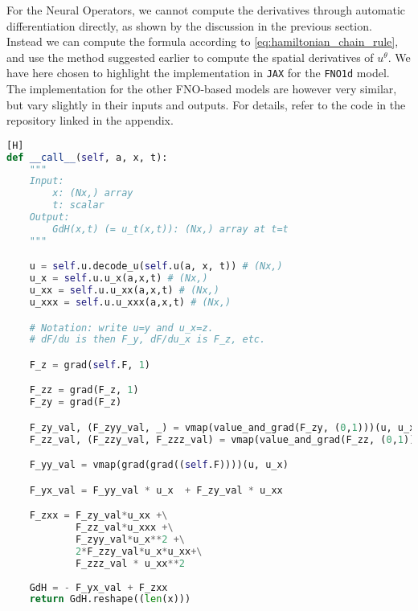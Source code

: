 For the Neural Operators, we cannot compute the derivatives through automatic differentiation directly, as shown by the discussion in the previous section.
Instead we can compute the formula according to \cref{eq:hamiltonian_chain_rule}, and use the method suggested earlier to compute the spatial derivatives of \(u^\theta\).
We have here chosen to highlight the implementation in \texttt{JAX} for the \texttt{FNO1d} model. The implementation for the other FNO-based models are however very similar, but
vary slightly in their inputs and outputs. For details, refer to the code in the repository linked in the appendix.

\begin{lstlisting}[language=Python, caption=Computing the Hamiltonian PDE right-hand side for the FNO1d model][H]
def __call__(self, a, x, t):
    """
    Input:
        x: (Nx,) array
        t: scalar
    Output:
        GdH(x,t) (= u_t(x,t)): (Nx,) array at t=t
    """

    u = self.u.decode_u(self.u(a, x, t)) # (Nx,)
    u_x = self.u.u_x(a,x,t) # (Nx,)
    u_xx = self.u.u_xx(a,x,t) # (Nx,)
    u_xxx = self.u.u_xxx(a,x,t) # (Nx,)

    # Notation: write u=y and u_x=z.
    # dF/du is then F_y, dF/du_x is F_z, etc.

    F_z = grad(self.F, 1)

    F_zz = grad(F_z, 1)
    F_zy = grad(F_z)

    F_zy_val, (F_zyy_val, _) = vmap(value_and_grad(F_zy, (0,1)))(u, u_x)
    F_zz_val, (F_zzy_val, F_zzz_val) = vmap(value_and_grad(F_zz, (0,1)))(u, u_x)

    F_yy_val = vmap(grad(grad((self.F))))(u, u_x)

    F_yx_val = F_yy_val * u_x  + F_zy_val * u_xx

    F_zxx = F_zy_val*u_xx +\
            F_zz_val*u_xxx +\
            F_zyy_val*u_x**2 +\
            2*F_zzy_val*u_x*u_xx+\
            F_zzz_val * u_xx**2
                                
    GdH = - F_yx_val + F_zxx
    return GdH.reshape((len(x)))
\end{lstlisting}